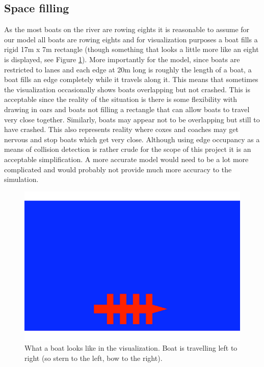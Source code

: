       \subsection{Space filling}
      As the most boats on the river are rowing eights it is reasonable to assume for our model all boats are rowing eights and for visualization purposes a boat fills a rigid 17m x 7m rectangle (though something that looks a little more like an eight is displayed, see Figure \ref{fig:model:boat}). More importantly for the model, since boats are restricted to lanes and each edge at 20m long is roughly the length of a boat, a boat fills an edge completely while it travels along it. This means that sometimes the visualization occasionally shows boats overlapping but not crashed. This is acceptable since the reality of the situation is there is some flexibility with drawing in oars and boats not filling a rectangle that can allow boats to travel very close together. Similarly, boats may appear not to be overlapping but still to have crashed. This also represents reality where coxes and coaches may get nervous and stop boats which get very close. Although using edge occupancy as a means of collision detection is rather crude for the scope of this project it is an acceptable simplification. A more accurate model would need to be a lot more complicated and would probably not provide much more accuracy to the simulation.
      
      \begin{figure}
      \begin{center}
      	\includegraphics[scale=0.3]{images/boat.png}
      	\caption{What a boat looks like in the visualization. Boat is travelling left to right (so stern to the left, bow to the right).}
      	\label{fig:model:boat}
      \end{center}
      \end{figure}
      
